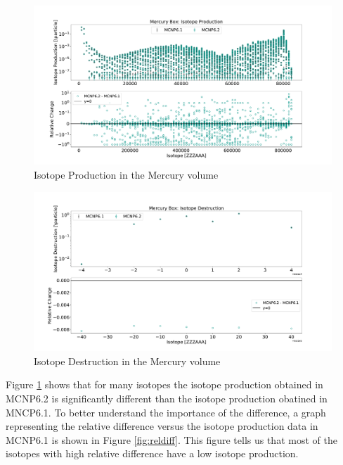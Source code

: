 \begin{figure}[h!]
        \centering
        \includegraphics[scale=0.4]{figs/prod_merbox_62_61.pdf}
	\caption{Isotope Production in the Mercury volume}
        \label{fig:prod}
\end{figure}

\begin{figure}[h!]
        \centering
        \includegraphics[scale=0.4]{figs/dest_merbox_62_61.pdf}
	\caption{Isotope Destruction in the Mercury volume}
        \label{fig:dest}
\end{figure}

Figure \ref{fig:prod} shows that for many isotopes the isotope 
production obtained in MCNP6.2 is significantly different than the
isotope production obatined in MNCP6.1. 
To better understand the importance of
the difference, a graph representing the relative difference versus the
isotope production data in MCNP6.1 is shown in Figure \ref{fig:reldiff}. This 
figure tells us that most of the isotopes with high relative difference
have a low isotope production.

